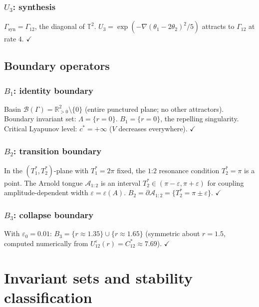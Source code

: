 \documentclass[12pt, oneside]{book}
\theoremstyle{plain}
\theoremstyle{definition}
\theoremstyle{remark}
\newcommand{\R}{\mathbb{R}}
\newcommand{\T}{\mathbb{T}}
\newcommand{\Orb}{\Gamma}
\newcommand{\cB}{\mathcal{B}}
\newcommand{\eps}{\varepsilon}
\begin{document}
\subsubsection{$U_3$: synthesis}

$\Orb_{\mathrm{syn}}=\Orb_{12}$, the diagonal of $\T^2$.
$U_3=\exp(-\nabla(\theta_1-2\theta_2)^2/5)$ attracts to
$\Orb_{12}$ at rate $4$. $\checkmark$

\subsection{Boundary operators}

\subsubsection{$B_1$: identity boundary}

Basin $\cB(\Orb)=\R^2_{>0}\setminus\{0\}$ (entire punctured plane;
no other attractors). Boundary invariant set: $\Lambda=\{r=0\}$.
$B_1=\{r=0\}$, the repelling singularity. Critical Lyapunov level:
$c^*=+\infty$ ($V$ decreases everywhere). $\checkmark$

\subsubsection{$B_2$: transition boundary}

In the $(T_1^*,T_2^*)$-plane with $T_1^*=2\pi$ fixed, the $1$:$2$
resonance condition $T_2^*=\pi$ is a point. The Arnold tongue
$\mathcal{A}_{1:2}$ is an interval $T_2^*\in(\pi-\eps,\pi+\eps)$
for coupling amplitude-dependent width $\eps=\eps(A)$.
$B_2=\partial\mathcal{A}_{1:2}=\{T_2^*=\pi\pm\eps\}$. $\checkmark$

\subsubsection{$B_3$: collapse boundary}

With $\eps_0=0.01$: $B_3=\{r\approx 1.35\}\cup\{r\approx 1.65\}$
(symmetric about $r=1.5$, computed numerically from
$U_{12}^\eps(r)=C_{12}^*\approx 7.69$). $\checkmark$

\section{Invariant sets and stability classification}\label{sec:invariants}
\end{document}
